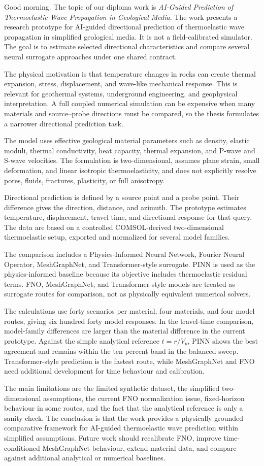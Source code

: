 \documentclass[11pt,a4paper]{article}
\begin{document}
Good morning. The topic of our diploma work is \textit{AI-Guided Prediction of Thermoelastic Wave Propagation in Geological Media}. The work presents a research prototype for AI-guided directional prediction of thermoelastic wave propagation in simplified geological media. It is not a field-calibrated simulator. The goal is to estimate selected directional characteristics and compare several neural surrogate approaches under one shared contract.

The physical motivation is that temperature changes in rocks can create thermal expansion, stress, displacement, and wave-like mechanical response. This is relevant for geothermal systems, underground engineering, and geophysical interpretation. A full coupled numerical simulation can be expensive when many materials and source--probe directions must be compared, so the thesis formulates a narrower directional prediction task.

The model uses effective geological material parameters such as density, elastic moduli, thermal conductivity, heat capacity, thermal expansion, and P-wave and S-wave velocities. The formulation is two-dimensional, assumes plane strain, small deformation, and linear isotropic thermoelasticity, and does not explicitly resolve pores, fluids, fractures, plasticity, or full anisotropy.

Directional prediction is defined by a source point and a probe point. Their difference gives the direction, distance, and azimuth. The prototype estimates temperature, displacement, travel time, and directional response for that query. The data are based on a controlled COMSOL-derived two-dimensional thermoelastic setup, exported and normalized for several model families.

The comparison includes a Physics-Informed Neural Network, Fourier Neural Operator, MeshGraphNet, and Transformer-style surrogate. PINN is used as the physics-informed baseline because its objective includes thermoelastic residual terms. FNO, MeshGraphNet, and Transformer-style models are treated as surrogate routes for comparison, not as physically equivalent numerical solvers.

The calculations use forty scenarios per material, four materials, and four model routes, giving six hundred forty model responses. In the travel-time comparison, model-family differences are larger than the material difference in the current prototype. Against the simple analytical reference $t=r/V_p$, PINN shows the best agreement and remains within the ten percent band in the balanced sweep. Transformer-style prediction is the fastest route, while MeshGraphNet and FNO need additional development for time behaviour and calibration.

The main limitations are the limited synthetic dataset, the simplified two-dimensional assumptions, the current FNO normalization issue, fixed-horizon behaviour in some routes, and the fact that the analytical reference is only a sanity check. The conclusion is that the work provides a physically grounded comparative framework for AI-guided thermoelastic wave prediction within simplified assumptions. Future work should recalibrate FNO, improve time-conditioned MeshGraphNet behaviour, extend material data, and compare against additional analytical or numerical baselines.
\end{document}
